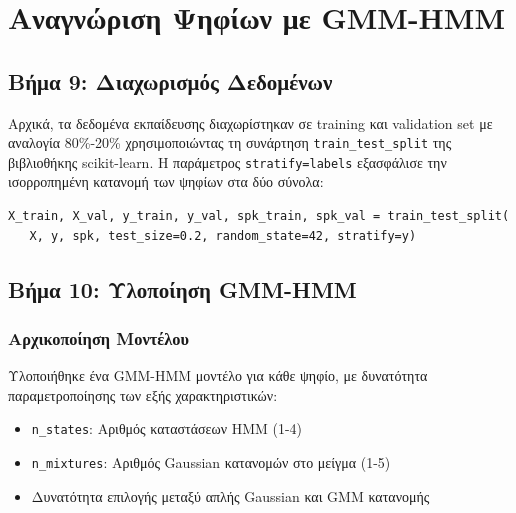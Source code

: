 \documentclass[a4paper,12pt]{article}
\begin{document}
\section*{Αναγνώριση Ψηφίων με GMM-HMM}

\subsection*{Βήμα 9: Διαχωρισμός Δεδομένων}

Αρχικά, τα δεδομένα εκπαίδευσης διαχωρίστηκαν σε training και validation set με αναλογία 80\%-20\% χρησιμοποιώντας τη συνάρτηση \texttt{train\_test\_split} της βιβλιοθήκης scikit-learn. Η παράμετρος \texttt{stratify=labels} εξασφάλισε την ισορροπημένη κατανομή των ψηφίων στα δύο σύνολα:

\begin{verbatim}
X_train, X_val, y_train, y_val, spk_train, spk_val = train_test_split(
   X, y, spk, test_size=0.2, random_state=42, stratify=y)
\end{verbatim}

\subsection*{Βήμα 10: Υλοποίηση GMM-HMM}

\subsubsection*{Αρχικοποίηση Μοντέλου}
Υλοποιήθηκε ένα GMM-HMM μοντέλο για κάθε ψηφίο, με δυνατότητα παραμετροποίησης των εξής χαρακτηριστικών:
\begin{itemize}
    \item \texttt{n\_states}: Αριθμός καταστάσεων HMM (1-4)
    \item \texttt{n\_mixtures}: Αριθμός Gaussian κατανομών στο μείγμα (1-5)
    \item Δυνατότητα επιλογής μεταξύ απλής Gaussian και GMM κατανομής
\end{itemize}
\end{document}
